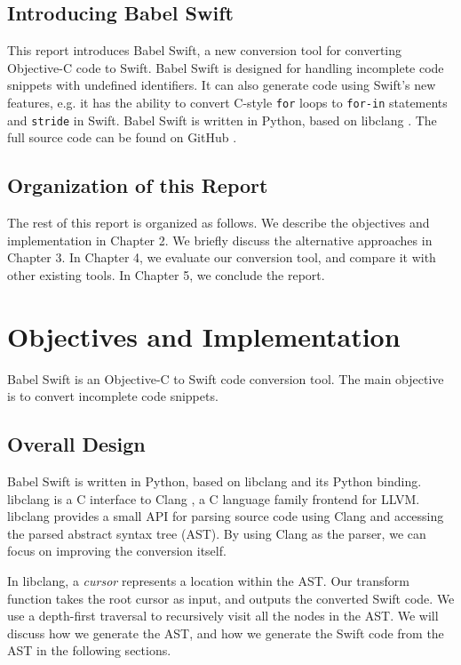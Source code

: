 \documentclass{sfuthesis}
\begin{document}
\section{Introducing Babel Swift}

This report introduces Babel Swift, a new conversion tool for converting Objective-C code to Swift. Babel Swift is designed for handling incomplete code snippets with undefined identifiers. It can also generate code using Swift's new features, e.g. it has the ability to convert C-style \texttt{for} loops to \texttt{for-in} statements and \texttt{stride} in Swift. Babel Swift is written in Python, based on libclang \cite{libclang}. The full source code can be found on GitHub \cite{babelswift}.

\section{Organization of this Report}

The rest of this report is organized as follows. We describe the objectives and implementation in Chapter 2. We briefly discuss the alternative approaches in Chapter 3. In Chapter 4, we evaluate our conversion tool, and compare it with other existing tools. In Chapter 5, we conclude the report.

\chapter{Objectives and Implementation}

Babel Swift is an Objective-C to Swift code conversion tool. The main objective is to convert incomplete code snippets.

\section{Overall Design}

Babel Swift is written in Python, based on libclang \cite{libclang} and its Python binding. libclang is a C interface to Clang \cite{clang}, a C language family frontend for LLVM. libclang provides a small API for parsing source code using Clang and accessing the parsed abstract syntax tree (AST). By using Clang as the parser, we can focus on improving the conversion itself.

In libclang, a \emph{cursor} represents a location within the AST. Our transform function takes the root cursor as input, and outputs the converted Swift code. We use a depth-first traversal to recursively visit all the nodes in the AST. We will discuss how we generate the AST, and how we generate the Swift code from the AST in the following sections.
\end{document}
